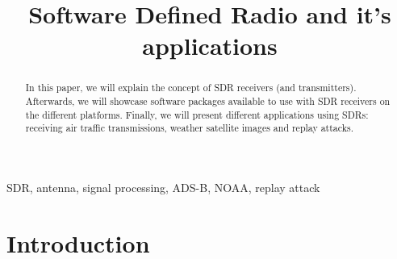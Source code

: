 \documentclass[conference]{IEEEtran}
\begin{document}
\title{Software Defined Radio and it's applications
}

\author{
	\and
}

\maketitle

\begin{abstract}
In this paper, we will explain the concept of SDR receivers (and transmitters). Afterwards, we will showcase software packages available to use with SDR receivers on the different platforms. Finally, we will present different applications using SDRs: receiving air traffic transmissions, weather satellite images and replay attacks.
\end{abstract}

\begin{IEEEkeywords}
SDR, antenna, signal processing, ADS-B, NOAA, replay attack
\end{IEEEkeywords}

\section{Introduction} %
\end{document}

